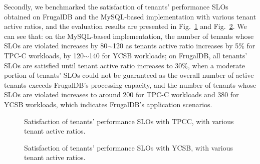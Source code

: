 Secondly, we benchmarked the satisfaction of tenants' performance SLOs obtained on FrugalDB and the MySQL-based implementation with various tenant active ratios, and the evaluation results are presented in Fig.~\ref{fig:stps-vtar1} and Fig.~\ref{fig:stps-vtar2}. We can see that: on the MySQL-based implementation, the number of tenants whose SLOs are violated increases by 80$\sim$120 as tenants active ratio increases by 5\% for TPC-C workloads, by 120$\sim$140 for YCSB workloads; on FrugalDB, all tenants' SLOs are satisfied until tenant active ratio increases to 30\%, when a moderate portion of tenants' SLOs could not be guaranteed as the overall number of active tenants exceeds FrugalDB's processing capacity, and the number of tenants whose SLOs are violated increases to around 200 for TPC-C workloads and 380 for YCSB workloads, which indicates FrugalDB's application scenarios.

\begin{figure}[!htb]
\caption{Satisfaction of tenants' performance SLOs with TPCC, with various tenant active ratios.}
\label{fig:stps-vtar1}
\end{figure}


\begin{figure}[!htb]
\caption{Satisfaction of tenants' performance SLOs with YCSB, with various tenant active ratios.}
\label{fig:stps-vtar2}
\end{figure}


